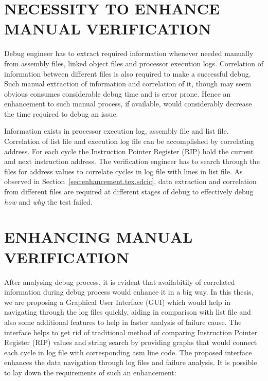 \section {NECESSITY TO ENHANCE MANUAL VERIFICATION}
\label{sec:enhancement.tex.nemv}

Debug engineer has to extract required information whenever needed manually from assembly files, linked object files and processor execution logs. Correlation of information between different files is also required to make a successful debug. Such manual extraction of information and correlation of it, though may seem obvious consumes considerable debug time and is error prone. Hence an enhancement to such manual process, if available, would considerably decrease the time required to debug an issue.

Information exists in processor execution log, assembly file and list file. Correlation of list file and execution log file can be accomplished by correlating address. For each cycle the Instruction Pointer Register (RIP) hold the current and next instruction address. The verification engineer has to search through the files for address values to correlate cycles in log file with lines in list file. As observed in Section~\ref{sec:enhancement.tex.sdcic}, data extraction and correlation from different files are required at different stages of debug to effectively debug {\it how} and {\it why} the test failed.

\section {ENHANCING MANUAL VERIFICATION}
\label{sec:enhancement.tex.emv}

After analysing debug process, it is evident that availabitily of correlated information during debug process would enhance it in a big way.  In this thesis, we are proposing a Graphical User Interface (GUI) which would help in navigating through the log files quickly, aiding in comparison with list file and also some additional features to help in faster analysis of failure cause. The interface helps to get rid of traditional method of comparing Instruction Pointer Register (RIP) values and string search by providing graphs that would connect each cycle in log file with corresponding asm line code. The proposed interface enhances the data navigation through log files and failure analysis.  It is possible to lay down the requirements of such an enhancement:


